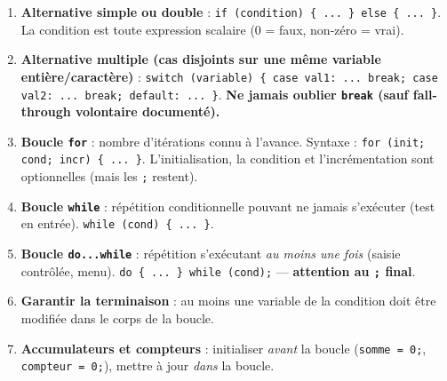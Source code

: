 \documentclass[11pt]{article}
\begin{document}
\begin{methode}
\begin{enumerate}
\item \textbf{Alternative simple ou double} : \texttt{if (condition) \{ ... \} else \{ ... \}}. La condition est toute expression scalaire (0 = faux, non-zéro = vrai).
\item \textbf{Alternative multiple (cas disjoints sur une même variable entière/caractère)} : \texttt{switch (variable) \{ case val1: ... break; case val2: ... break; default: ... \}}. \textbf{Ne jamais oublier \texttt{break} (sauf fall-through volontaire documenté).}
\item \textbf{Boucle \texttt{for}} : nombre d'itérations connu à l'avance. Syntaxe : \texttt{for (init; cond; incr) \{ ... \}}. L'initialisation, la condition et l'incrémentation sont optionnelles (mais les \texttt{;} restent).
\item \textbf{Boucle \texttt{while}} : répétition conditionnelle pouvant ne jamais s'exécuter (test en entrée). \texttt{while (cond) \{ ... \}}.
\item \textbf{Boucle \texttt{do...while}} : répétition s'exécutant \emph{au moins une fois} (saisie contrôlée, menu). \texttt{do \{ ... \} while (cond);} — \textbf{attention au \texttt{;} final}.
\item \textbf{Garantir la terminaison} : au moins une variable de la condition doit être modifiée dans le corps de la boucle.
\item \textbf{Accumulateurs et compteurs} : initialiser \emph{avant} la boucle (\texttt{somme = 0;}, \texttt{compteur = 0;}), mettre à jour \emph{dans} la boucle.
\end{enumerate}
\end{methode}
\end{document}
